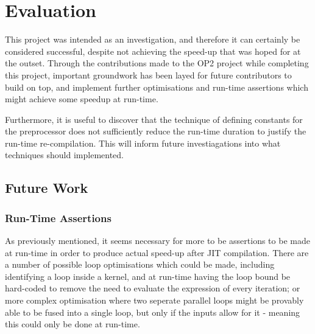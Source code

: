 
\section{Evaluation}
\label{s:eval}

This project was intended as an investigation, and therefore it can certainly be considered successful, despite not achieving the speed-up that was hoped for at the outset. Through the contributions made to the OP2 project while completing this project, important groundwork has been layed for future contributors to build on top, and implement further optimisations and run-time assertions which might achieve some speedup at run-time. \par Furthermore, it is useful to discover that the technique of defining constants for the preprocessor does not sufficiently reduce the run-time duration to justify the run-time re-compilation. This will inform future investiagations into what techniques should implemented.

\subsection{Future Work}
\label{ss:fw}

\subsubsection{Run-Time Assertions}
As previously mentioned, it seems necessary for more to be assertions to be made at run-time in order to produce actual speed-up after JIT compilation. There are a number of possible loop optimisations which could be made, including identifying a loop inside a kernel, and at run-time having the loop bound be hard-coded to remove the need to evaluate the expression of every iteration; or more complex optimisation where two seperate parallel loops might be provably able to be fused into a single loop, but only if the inputs allow for it - meaning this could only be done at run-time.

